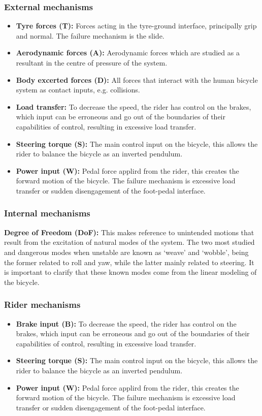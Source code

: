 \documentclass{article}
\begin{document}
\subsubsection{External mechanisms}
\begin{itemize}
    \item \textbf{Tyre forces (T):} Forces acting in the tyre-ground interface, principally grip and normal. The failure mechanism is the slide.
    \item \textbf{Aerodynamic forces (A):} Aerodynamic forces which are studied as a resultant in the centre of pressure of the system.
    \item \textbf{Body excerted forces (D):} All forces that interact with the human bicycle system as contact inputs, e.g. collisions.
    \item \textbf{Load transfer:} To decrease the speed, the rider has control on the brakes, which input can be erroneous and go out of the boundaries of their capabilities of control, resulting in excessive load transfer.
    \item \textbf{Steering torque (S):} The main control input on the bicycle, this allows the rider to balance the bicycle as an inverted pendulum.
    \item \textbf{Power input (W):} Pedal force applird from the rider, this creates the forward motion of the bicycle.
        The failure mechanism is excessive load transfer or sudden disengagement of the foot-pedal interface.
\end{itemize}

\subsubsection{Internal mechanisms}

\textbf{Degree of Freedom (DoF):} This makes reference to unintended motions that result from the excitation of natural modes of the system.
%
The two most studied and dangerous modes when unstable are known as `weave' and `wobble', being the former related to roll and yaw, while the latter mainly related to steering.
%
It is important to clarify that these known modes come from the linear modeling of the bicycle.

\subsubsection{Rider mechanisms}
\begin{itemize}
    \item \textbf{Brake input (B):} To decrease the speed, the rider has control on the brakes, which input can be erroneous and go out of the boundaries of their capabilities of control, resulting in excessive load transfer.
    \item \textbf{Steering torque (S):} The main control input on the bicycle, this allows the rider to balance the bicycle as an inverted pendulum.
    \item \textbf{Power input (W):} Pedal force applird from the rider, this creates the forward motion of the bicycle.
        The failure mechanism is excessive load transfer or sudden disengagement of the foot-pedal interface.
\end{itemize}
\end{document}
